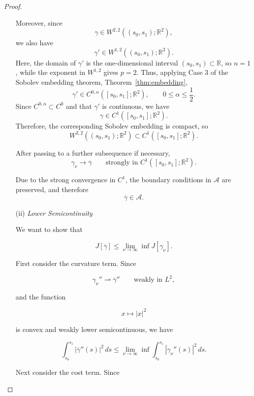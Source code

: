 \begin{proof}
\begin{enumerate}
        Moreover, since
        $$
        \gamma\in W^{2,2}((s_0,s_1);\mathbb{R}^2),
        $$
        we also have
        $$
        \gamma'\in W^{1,2}((s_0,s_1);\mathbb{R}^2).
        $$
        Here, the domain of $\gamma'$ is the one-dimensional interval
        $(s_0,s_1)\subset\mathbb{R}$, so $n=1$, while the exponent in
        $W^{1,2}$ gives $p=2$. Thus, applying Case 3 of the Sobolev embedding theorem,
        Theorem~\ref{thm:embedding},
        $$
        \gamma'\in C^{0,\alpha}([s_0,s_1];\mathbb{R}^2),
        \qquad 0\leq\alpha\leq\frac{1}{2}.
        $$
        Since $C^{0,\alpha} \subset C^0$ and that $\gamma'$ is continuous, we have
        $$
        \gamma\in C^1([s_0,s_1];\mathbb{R}^2).
        $$
        Therefore, the corresponding Sobolev embedding is compact, so
        $$
        W^{2,2}((s_0,s_1);\mathbb{R}^2)
        \subset C^1([s_0,s_1];\mathbb{R}^2).
        $$

        After passing to a further subsequence if necessary,
        $$
        \gamma_\nu\rightarrow\overline{\gamma}
        \qquad\text{strongly in }C^1([s_0,s_1];\mathbb{R}^2).
        $$
        
        Due to the strong convergence in $C^1$, the boundary conditions in $\mathcal{A}$ are preserved, and therefore
        $$
        \overline{\gamma}\in\mathcal{A}.
        $$

        
        \item[(ii)] \textit{Lower Semicontinuity}

        We want to show that
        
        $$
        J[\overline{\gamma}]
        \leq
        \lim_{\nu\rightarrow\infty}\inf J[\gamma_\nu].
        $$
        
        First consider the curvature term. Since
        
        $$
        \gamma_\nu''\rightharpoonup\overline{\gamma}''
        \qquad\text{weakly in }L^2,
        $$
        
        and the function
        
        $$
        x\mapsto |x|^2
        $$
        
        is convex and weakly lower semicontinuous, we have
        
        $$
        \int_{s_0}^{s_1}|\overline{\gamma}''(s)|^2\,ds
        \leq
        \lim_{\nu\rightarrow\infty} \inf
        \int_{s_0}^{s_1}|\gamma_\nu''(s)|^2\,ds.
        $$
        
        Next consider the cost term. Since
        

\end{enumerate}
\end{proof}
